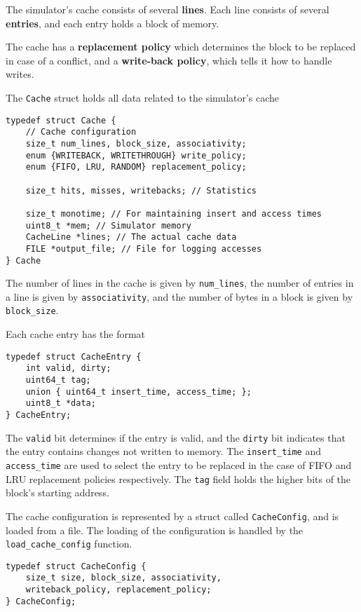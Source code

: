 \documentclass{article}
\begin{document}
The simulator's cache consists of several \textbf{lines}. Each line consists of several
\textbf{entries}, and each entry holds a block of memory. 

The cache has a \textbf{replacement policy} which determines the block to be replaced in
case of a conflict, and a \textbf{write-back policy}, which tells it how to handle writes.

The \texttt{Cache} struct holds all data related to the simulator's cache

\begin{verbatim} 
typedef struct Cache {
    // Cache configuration
    size_t num_lines, block_size, associativity;
    enum {WRITEBACK, WRITETHROUGH} write_policy;
    enum {FIFO, LRU, RANDOM} replacement_policy;
    
    size_t hits, misses, writebacks; // Statistics

    size_t monotime; // For maintaining insert and access times
    uint8_t *mem; // Simulator memory 
    CacheLine *lines; // The actual cache data
    FILE *output_file; // File for logging accesses
} Cache
\end{verbatim}

The number of lines in the cache is given by \texttt{num\_lines},
the number of entries in a line is given by \texttt{associativity},
and the number of bytes in a block is given by \texttt{block\_size}.

Each cache entry has the format

\begin{verbatim}
typedef struct CacheEntry {
    int valid, dirty;
    uint64_t tag;
    union { uint64_t insert_time, access_time; };
    uint8_t *data;
} CacheEntry;    
\end{verbatim}

The \texttt{valid} bit determines if the entry is valid, and the
\texttt{dirty} bit indicates that the entry contains changes not
written to memory. The \texttt{insert\_time} and \texttt{access\_time}
are used to select the entry to be replaced in the case of FIFO
and LRU replacement policies respectively. The \texttt{tag}
field holds the higher bits of the block's starting address.

The cache configuration is represented by a struct called \texttt{CacheConfig},
and is loaded from a file. The loading of the configuration is handled by
the \texttt{load\_cache\_config} function.

\begin{verbatim}
typedef struct CacheConfig {
    size_t size, block_size, associativity,
    writeback_policy, replacement_policy;
} CacheConfig;    
\end{verbatim}
\end{document}
